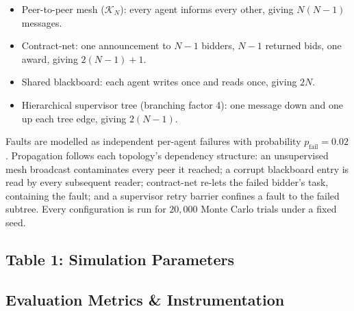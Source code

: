 \documentclass{article}
\begin{document}
\begin{itemize}
  \item Peer-to-peer mesh ($\mathcal{K}_N$): every agent informs every other, giving $N(N-1)$ messages.
  \item Contract-net: one announcement to $N-1$ bidders, $N-1$ returned bids, one award, giving $2(N-1)+1$.
  \item Shared blackboard: each agent writes once and reads once, giving $2N$.
  \item Hierarchical supervisor tree (branching factor 4): one message down and one up each tree edge, giving $2(N-1)$.
\end{itemize}

Faults are modelled as independent per-agent failures with probability $p_{\text{fail}} = 0.02$. Propagation follows each topology's dependency structure: an unsupervised mesh broadcast contaminates every peer it reached; a corrupt blackboard entry is read by every subsequent reader; contract-net re-lets the failed bidder's task, containing the fault; and a supervisor retry barrier confines a fault to the failed subtree. Every configuration is run for $20{,}000$ Monte Carlo trials under a fixed seed.


\subsection{Table 1: Simulation Parameters}
\begin{table}[htbp]
\centering
{}
\end{table}


\subsection{Evaluation Metrics \& Instrumentation}
\end{document}
